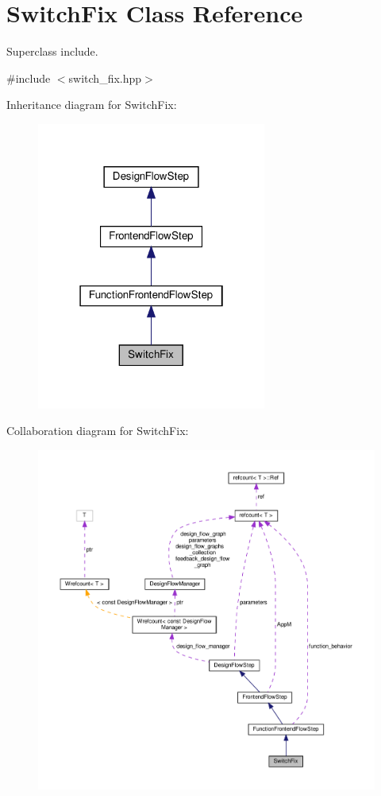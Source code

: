 \hypertarget{classSwitchFix}{}\section{Switch\+Fix Class Reference}
\label{classSwitchFix}


Superclass include.  




{\ttfamily \#include $<$switch\+\_\+fix.\+hpp$>$}



Inheritance diagram for Switch\+Fix\+:
\nopagebreak
\begin{figure}[H]
\begin{center}
\leavevmode
\includegraphics[width=214pt]{d0/d07/classSwitchFix__inherit__graph}
\end{center}
\end{figure}


Collaboration diagram for Switch\+Fix\+:
\nopagebreak
\begin{figure}[H]
\begin{center}
\leavevmode
\includegraphics[width=350pt]{d6/dc8/classSwitchFix__coll__graph}
\end{center}
\end{figure}
